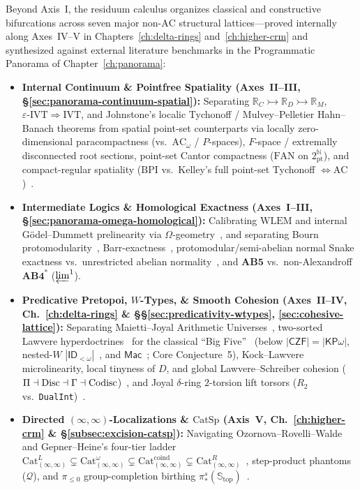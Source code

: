 Beyond Axis~I, the residuum calculus organizes classical and constructive bifurcations across seven major non-$\mathrm{AC}$ structural lattices---proved internally along Axes~IV--V in Chapters~\ref{ch:delta-rings} and~\ref{ch:higher-crm} and synthesized against external literature benchmarks in the Programmatic Panorama of Chapter~\ref{ch:panorama}:
\begin{itemize}
  \item \textbf{Internal Continuum \& Pointfree Spatiality (Axes~II--III, \S\ref{sec:panorama-continuum-spatial}):} Separating $\mathbb{R}_C \rightarrowtail \mathbb{R}_D \rightarrowtail \mathbb{R}_M$, $\varepsilon\text{-}\mathrm{IVT} \Rightarrow \mathrm{IVT}$, and Johnstone's localic Tychonoff / Mulvey--Pelletier Hahn--Banach theorems from spatial point-set counterparts via locally zero-dimensional paracompactness (vs.\ $\mathrm{AC}_\omega$ / $P$-spaces), $F$-space / extremally disconnected root sections, point-set Cantor compactness ($\mathrm{FAN}$ on $2^{\mathbb{N}}_{\mathrm{pt}}$), and compact-regular spatiality ($\mathrm{BPI}$ vs.\ Kelley's full point-set Tychonoff $\iff \mathrm{AC}$)~\cite{FourmanHyland79,Bishop67,Ishihara06,BridgesRichman87,Johnstone81,Johnstone82,MulveyPelletier91,Deligne72,Johnstone02}.
  \item \textbf{Intermediate Logics \& Homological Exactness (Axes~I--III, \S\ref{sec:panorama-omega-homological}):} Calibrating $\mathrm{WLEM}$ and internal G\"odel--Dummett prelinearity via $\Omega$-geometry~\cite{Johnstone82,Johnstone02}, and separating Bourn protomodularity~\cite{Bourn91}, Barr-exactness~\cite[\S\S A1.3--A1.4]{Johnstone02}, protomodular/semi-abelian normal Snake exactness vs.\ unrestricted abelian normality~\cite{JMT02,MacLane98}, and $\mathbf{AB5}$ vs.\ non-Alexandroff $\mathbf{AB4}^*$ ($\varprojlim^1$).
  \item \textbf{Predicative Pretopoi, $W$-Types, \& Smooth Cohesion (Axes~II--IV, Ch.~\ref{ch:delta-rings} \& \S\S\ref{sec:predicativity-wtypes}, \ref{sec:cohesive-lattice}):} Separating Maietti--Joyal Arithmetic Universes~\cite{Maietti05}, two-sorted Lawvere hyperdoctrines~\cite{Lawvere69} for the classical ``Big Five''~\cite{Friedman75,Simpson09} (below $|\mathsf{CZF}| = |\mathsf{KP}\omega|$, nested-$W$ $|\mathsf{ID}_{<\omega}|$~\cite{Aczel78}, and $\mathsf{Mac}$~\cite{Cole73}; Core Conjecture~5), Kock--Lawvere microlinearity, local tinyness of $D$, and global Lawvere--Schreiber cohesion ($\Pi \dashv \mathrm{Disc} \dashv \Gamma \dashv \mathrm{Codisc}$)~\cite{Kock06,MoerdijkReyes91,Diaconescu75,Lawvere07,Schreiber13}, and Joyal $\delta$-ring $2$-torsion lift torsors ($R_2$ vs.\ \texttt{DualInt})~\cite{Joyal85}.
  \item \textbf{Directed $(\infty, \infty)$-Localizations \& $\mathrm{CatSp}$ (Axis~V, Ch.~\ref{ch:higher-crm} \& \S\ref{subsec:excision-catsp}):} Navigating Ozornova--Rovelli--Walde and Gepner--Heine's four-tier ladder $\mathrm{Cat}^L_{(\infty,\infty)} \subsetneq \mathrm{Cat}^\omega_{(\infty,\infty)} \subsetneq \mathrm{Cat}^{\mathrm{coind}}_{(\infty,\infty)} \subsetneq \mathrm{Cat}^R_{(\infty,\infty)}$~\cite{ORW26,GepnerHeine26}, step-product phantoms ($\mathcal{Q}$), and $\pi_{\le 0}$ group-completion birthing $\pi_*^s(\mathbb{S}_{\mathrm{top}})$~\cite{Heine26,Geiss26,BarrattPriddy72,Quillen71}.
\end{itemize}

